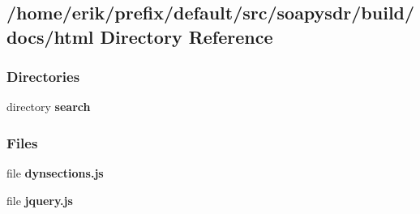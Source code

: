 \subsection{/home/erik/prefix/default/src/soapysdr/build/docs/html Directory Reference}
\label{dir_aa72d203b6c587057da832522f88a7b9}
\subsubsection*{Directories}
\begin{DoxyCompactItemize}
\item 
directory {\bf search}
\end{DoxyCompactItemize}
\subsubsection*{Files}
\begin{DoxyCompactItemize}
\item 
file {\bf dynsections.\+js}
\item 
file {\bf jquery.\+js}
\end{DoxyCompactItemize}
